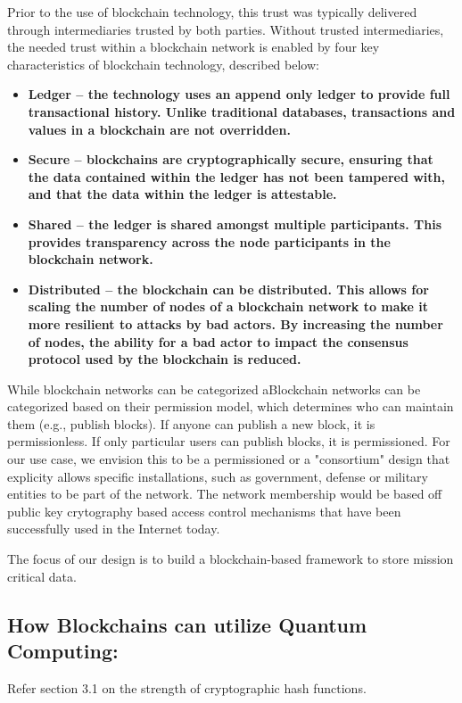  Prior to the use of blockchain
technology, this trust was typically delivered through intermediaries trusted by both parties.
Without trusted intermediaries, the needed trust within a blockchain network is enabled by four
key characteristics of blockchain technology, described below:
\begin{itemize}
\item \bf{Ledger} – the technology uses an append only ledger to provide full transactional history.
Unlike traditional databases, transactions and values in a blockchain are not overridden.
\item \bf{Secure} – blockchains are cryptographically secure, ensuring that the data contained
within the ledger has not been tampered with, and that the data within the ledger is
attestable.
\item \bf{Shared} – the ledger is shared amongst multiple participants. This provides transparency
across the node participants in the blockchain network.
\item \bf{Distributed} – the blockchain can be distributed. This allows for scaling the number of
nodes of a blockchain network to make it more resilient to attacks by bad actors. By
increasing the number of nodes, the ability for a bad actor to impact the consensus
protocol used by the blockchain is reduced.
\end{itemize}

While blockchain networks can be categorized aBlockchain networks can be categorized based on their permission model, which determines who
can maintain them (e.g., publish blocks). If anyone can publish a new block, it is permissionless.
If only particular users can publish blocks, it is permissioned. For our use case, we envision this to be a permissioned or a
"consortium" design that explicity allows specific installations, such as government, defense or military entities to be part of the network.
The network membership would be based off public key crytography based access control mechanisms that have been successfully used in the 
Internet today.

The focus of our design is to build a blockchain-based framework to store mission critical data.

\subsection{How Blockchains can utilize Quantum Computing:}


Refer section 3.1 on the strength of cryptographic hash functions.


